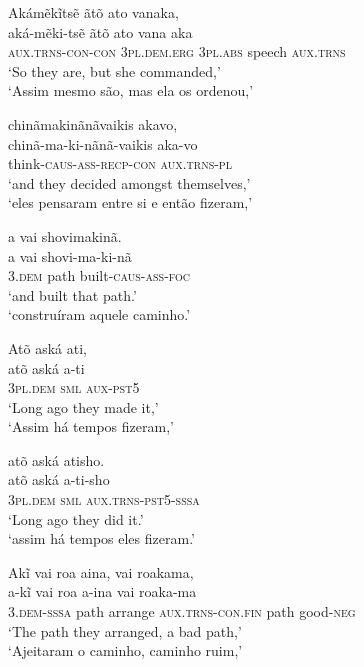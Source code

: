 \documentclass[output=paper,
modfonts,nonflat
]{langsci/langscibook}
\begin{document}
\ea Akámẽkĩtsẽ ãtõ ato vanaka, \\[.3em]
\gll aká-mẽki-tsẽ              ãtõ                  ato              vana   aka               \\
     \textsc{aux.trns-con-con} \textsc{3pl.dem.erg} \textsc{3pl.abs} speech \textsc{aux.trns} \\
\glt `So they are, but she commanded,' \\
`Assim mesmo são, mas ela os ordenou,' \\
\z

\ea chinãmakinãnãvaikis akavo, \\[.3em]
\gll chinã-ma-ki-nãnã-vaikis          aka-vo               \\
     think-\textsc{caus-ass-recp-con} \textsc{aux.trns-pl} \\
\glt `and they decided amongst themselves,' \\
`eles pensaram entre si e então fizeram,' \\
\z

\ea a vai shovimakinã. \\[.3em]
\gll a              vai  shovi-ma-ki-nã              \\
     3.\textsc{dem} path built-\textsc{caus-ass-foc} \\
\glt `and built that path.' \\
`construíram aquele caminho.'\\
\z

\ea Atõ aská ati, \\[.3em]
\gll atõ              aská         a-ti              \\
     \textsc{3pl.dem} \textsc{sml} \textsc{aux-pst5} \\
\glt `Long ago they made it,' \\
`Assim há tempos fizeram,' \\
\z

\ea atõ aská atisho. \\[.3em]
\gll atõ              aská         a-ti-sho                    \\
     3\textsc{pl.dem} \textsc{sml} \textsc{aux.trns-pst5-sssa} \\
\glt `Long ago they did it.' \\
`assim há tempos eles fizeram.' \\
\z

\ea Akĩ vai roa aina, vai roakama, \\[.3em]
\gll a-kĩ                vai  roa     a-ina                     vai  roaka-ma          \\
     3.\textsc{dem-sssa} path arrange \textsc{aux.trns-con.fin} path good-\textsc{neg} \\
\glt `The path they arranged, a bad path,' \\
`Ajeitaram o caminho, caminho ruim,' \\
\z
\end{document}
